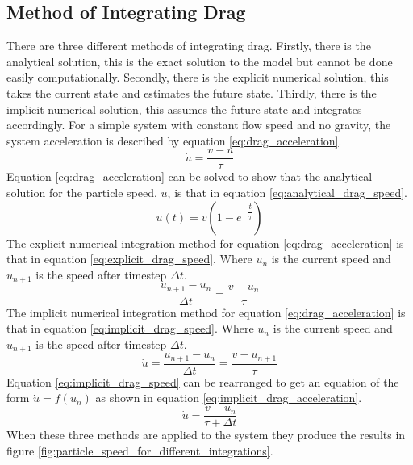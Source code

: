 \documentclass[10pt,a4paper,titlepage]{report}
\begin{document}
\subsection{Method of Integrating Drag}
There are three different methods of integrating drag. Firstly, there is the analytical solution, this is the exact solution to the model but cannot be done easily computationally. Secondly, there is the explicit numerical solution, this takes the current state and estimates the future state. Thirdly, there is the implicit numerical solution, this assumes the future state and integrates accordingly.
For a simple system with constant flow speed and no gravity, the system acceleration is described by equation \ref{eq:drag_acceleration}.
\begin{equation}
\dot{u} = \dfrac{v-u}{\tau}
\label{eq:drag_acceleration}
\end{equation}
Equation \ref{eq:drag_acceleration} can be solved to show that the analytical solution for the particle speed, $u$, is that in equation \ref{eq:analytical_drag_speed}.
\begin{equation}
u(t) = v(1 - e^{-\dfrac{t}{\tau}})
\label{eq:analytical_drag_speed}
\end{equation}
The explicit numerical integration method for equation \ref{eq:drag_acceleration} is that in equation \ref{eq:explicit_drag_speed}. Where $u_{n}$ is the current speed and $u_{n+1}$ is the speed after timestep $\Delta t$.
\begin{equation}
\dfrac{u_{n+1} - u_{n}}{\Delta t} = \dfrac{v - u_{n}}{\tau}
\label{eq:explicit_drag_speed}
\end{equation}
The implicit numerical integration method for equation \ref{eq:drag_acceleration} is that in equation \ref{eq:implicit_drag_speed}. Where $u_{n}$ is the current speed and $u_{n+1}$ is the speed after timestep $\Delta t$.
\begin{equation}
\dot{u} = \dfrac{u_{n+1} - u_{n}}{\Delta t} = \dfrac{v - u_{n+1}}{\tau}
\label{eq:implicit_drag_speed}
\end{equation}
Equation \ref{eq:implicit_drag_speed} can be rearranged to get an equation of the form $\dot{u} = f(u_{n})$ as shown in equation \ref{eq:implicit_drag_acceleration}.
\begin{equation}
\dot{u} = \dfrac{v - u_{n}}{\tau + \Delta t}
\label{eq:implicit_drag_acceleration}
\end{equation}
When these three methods are applied to the system they produce the results in figure \ref{fig:particle_speed_for_different_integrations}.
\end{document}
